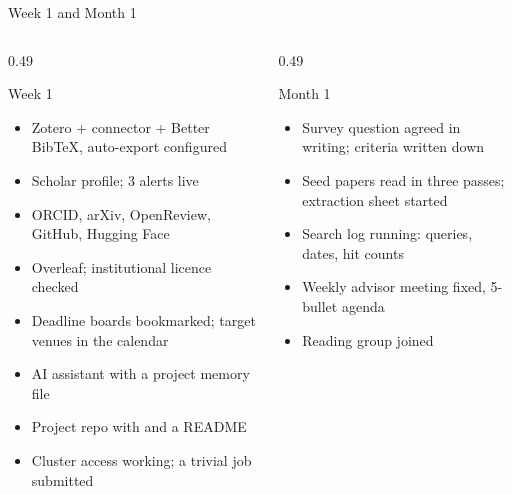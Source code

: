 \documentclass[aspectratio=169,11pt]{beamer}
\begin{document}
\begin{frame}{Week 1 and Month 1}
\begin{columns}[T]
\begin{column}{0.49\textwidth}
\begin{block}{Week 1}
\footnotesize
\begin{itemize}
  \item Zotero + connector + Better BibTeX, auto-export configured
  \item Scholar profile; 3 alerts live
  \item ORCID, arXiv, OpenReview, GitHub, Hugging Face
  \item Overleaf; institutional licence checked
  \item Deadline boards bookmarked; target venues in the calendar
  \item AI assistant with a project memory file
  \item Project repo with  and a README
  \item Cluster access working; a trivial job submitted
\end{itemize}
\end{block}
\end{column}
\begin{column}{0.49\textwidth}
\begin{block}{Month 1}
\footnotesize
\begin{itemize}
  \item Survey question agreed in writing; criteria written down
  \item Seed papers read in three passes; extraction sheet started
  \item Search log running: queries, dates, hit counts
  \item Weekly advisor meeting fixed, 5-bullet agenda
  \item Reading group joined
\end{itemize}
\end{block}
\end{column}
\end{columns}
\end{frame}
\end{document}
